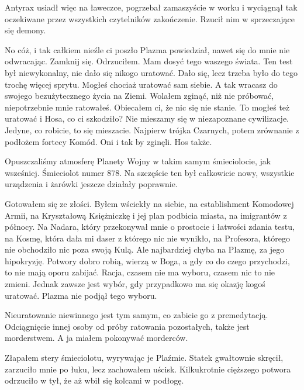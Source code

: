 Antyrax usiadł więc na ławeczce, pogrzebał zamaszyście w worku i wyciągnął tak oczekiwane przez wszystkich czytelników zakończenie.
Rzucił nim w sprzeczające się demony.

\divider{}

\begin{dialogue}
\ds{} No cóż, i tak całkiem nieźle ci poszło \dm{} Plazma powiedział, nawet się do mnie nie odwracając. 
\ds{} Zamknij się. \dm{} Odrzuciłem. \dm{} Mam dosyć tego waszego świata. Ten test był niewykonalny, nie dało się nikogo uratować.
\ds{} Dało się, lecz trzeba było do tego trochę więcej sprytu. Mogłeś chociaż uratować sam siebie. A tak wracasz do swojego bezużytecznego życia na Ziemi.
\ds{} Wolałem zginąć, niż nie próbować, niepotrzebnie mnie ratowałeś.
\ds{} Obiecałem ci, że nic się nie stanie.
\ds{} To mogłeś też uratować i Hosa, co ci szkodziło?
\ds{} Nie mieszamy się w niezapoznane cywilizacje.
\ds{} Jedyne, co robicie, to się mieszacie. Najpierw trójka Czarnych, potem zrównanie z podłożem fortecy Komód.
\ds{} Oni i tak by zginęli. Hos także. 
\end{dialogue}

Opuszczaliśmy atmosferę Planety Wojny w takim samym śmieciolocie, jak wsześniej. Śmieciolot numer 878.
Na szczęście ten był całkowicie nowy, wszystkie urządzenia i żarówki jeszcze działały poprawnie.

Gotowałem się ze złości. Byłem wściekły na siebie, na establishment Komodowej Armii, na Kryształową Księżniczkę i jej plan podbicia miasta, na imigrantów z północy.
Na Nadara, który przekonywał mnie o prostocie i łatwości zdania testu, na Kosmę, która dała mi daser z którego nic nie wynikło, na Profesora, którego nie obchodziło nic poza swoją Kulą.
Ale najbardziej chyba na Plazmę, za jego hipokryzję. 
Potwory dobro robią, wierzą w Boga, a gdy co do czego przychodzi, to nie mają oporu zabijać.
Racja, czasem nie ma wyboru, czasem nic to nie zmieni. Jednak zawsze jest wybór, gdy przypadkowo ma się okazję kogoś uratować.
Plazma nie podjął tego wyboru. 

Nieuratowanie niewinnego jest tym samym, co zabicie go z premedytacją.
Odciągnięcie innej osoby od próby ratowania pozostałych, także jest morderstwem.
A ja miałem pokonywać morderców.

Złapałem stery śmieciolotu, wyrywając je Plaźmie.
Statek gwałtownie skręcił, zarzuciło mnie po łuku, lecz zachowałem uścisk.
Kilkukrotnie cięższego potwora odrzuciło w tył, że aż wbił się kolcami w podłogę.

